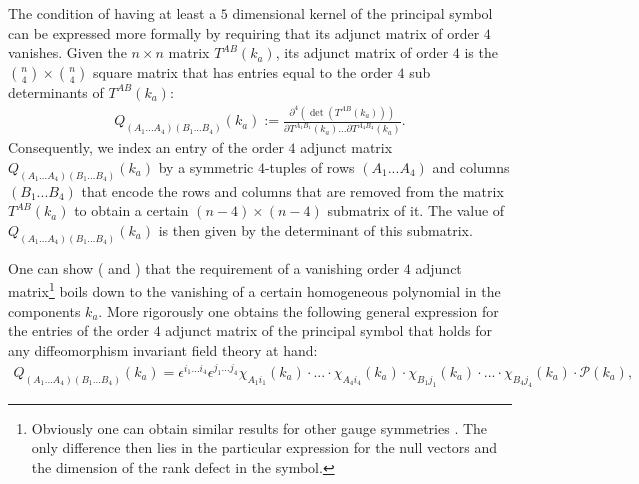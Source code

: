 The condition of having at least a $5$ dimensional kernel of the principal symbol can be expressed more formally by requiring that its adjunct matrix of order $4$ vanishes. Given the $n \times n$ matrix $T^{AB}(k_a)$, its adjunct matrix of order $4$ is the $\binom{n}{4} \times \binom{n}{4}$ square matrix that has entries equal to the order $4$ sub determinants of $T^{AB}(k_a)$:
\begin{align}\label{MinorDef}
    Q_{(A_1...A_4) (B_1...B_4)}(k_a) := \frac{\partial^4 (\operatorname{det}(T^{AB}(k_a)))}{\partial T^{A_1 B_1}(k_a) ... \partial T^{A_4 B_4}(k_a)}.
\end{align}
Consequently, we index an entry of the order $4$ adjunct matrix $Q_{(A_1...A_4) (B_1...B_4)}(k_a)$ by a symmetric $4$-tuples of rows $(A_1...A_4)$ and columns $(B_1...B_4)$ that encode the rows and columns that are removed from the matrix $T^{AB}(k_a)$ to obtain a certain $(n-4) \times (n-4)$ submatrix of it. The value of $Q_{(A_1...A_4) (B_1...B_4)}(k_a)$ is then given by the determinant of this submatrix. 

One can show (\cite{2018PhRvD..97h4036D} and \cite{2009JPhA...42U5402I}) that the requirement of a vanishing order $4$ adjunct matrix\footnote{Obviously one can obtain similar results for other gauge symmetries \cite{2018PhRvD..97h4036D}. The only difference then lies in the particular expression for the null vectors and the dimension of the rank defect in the symbol.} boils down to the vanishing of a certain homogeneous polynomial in the components $k_a$. More rigorously one obtains the following general expression for the entries of the order $4$ adjunct matrix of the principal symbol that holds for any diffeomorphism invariant field theory at hand:
\begin{align}\label{diffeoMinor}
    Q_{(A_1...A_4) (B_1...B_4)}(k_a) = \epsilon^{i_1...i_4} \epsilon^{j_1...j_4} \chi_{A_1i_1}(k_a) \cdot ... \cdot \chi_{A_4i_4}(k_a) \cdot \chi_{B_1j_1}(k_a) \cdot ... \cdot \chi_{B_4j_4}(k_a) \cdot \mathcal{P}(k_a),
\end{align}

